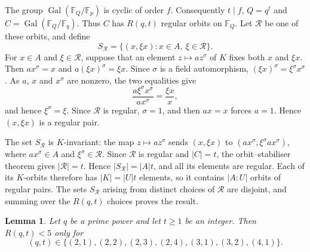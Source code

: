 \documentclass[10pt]{amsart}
\newtheorem{lemma}[theorem]{Lemma}
\theoremstyle{definition}
\renewcommand{\ge}{\geqslant}
\let\oldendproof\endproof
\renewenvironment{proof}[1][\proofname]{%
  \oldproof[\bfseries #1]%
}{\oldendproof}
\DeclareMathOperator{\Gal}{Gal}
\numberwithin{equation}{section}
\numberwithin{table}{section}
\begin{document}
\begin{proof}
The group $\Gal(\mathbb{F}_Q/\mathbb{F}_p)$ is cyclic of order $f$.
Consequently $t\mid f$, $Q=q^t$ and
$C=\Gal(\mathbb{F}_Q/\mathbb{F}_q)$. Thus $C$ has $R(q,t)$ regular orbits
on $\mathbb{F}_Q$. Let $\mathcal R$ be one of these orbits, and define
$$
  S_{\mathcal R}=\{(x,\xi x):x\in A,\ \xi\in\mathcal R\}.
$$
For $x\in A$ and $\xi\in\mathcal R$, suppose that an element
$z\mapsto az^\sigma$ of $K$ fixes both $x$ and $\xi x$. Then
$ax^\sigma=x$ and $a(\xi x)^\sigma=\xi x$. Since $\sigma$ is a field
automorphism, $(\xi x)^\sigma=\xi^\sigma x^\sigma$. As $a$, $x$ and
$x^\sigma$ are nonzero, the two equalities give
$$
  \frac{a\xi^\sigma x^\sigma}{ax^\sigma}=\frac{\xi x}{x},
$$
and hence $\xi^\sigma=\xi$. Since $\mathcal R$ is regular,
$\sigma=1$, and then $ax=x$ forces $a=1$. Hence $(x,\xi x)$ is a regular pair.

The set $S_{\mathcal R}$ is $K$-invariant: the map $z\mapsto az^\sigma$
sends $(x,\xi x)$ to
$(ax^\sigma,\xi^\sigma ax^\sigma)$, where $ax^\sigma\in A$ and
$\xi^\sigma\in\mathcal R$. Since
$\mathcal R$ is regular and $|C|=t$, the orbit--stabiliser theorem gives
$|\mathcal R|=t$. Hence $|S_{\mathcal R}|=|A|t$, and all its elements are
regular. Each of its $K$-orbits
therefore has $|K|=|U|t$ elements, so it contains $|A:U|$ orbits of regular
pairs. The sets $S_{\mathcal R}$ arising from distinct choices of
$\mathcal R$ are disjoint,
and summing over the $R(q,t)$ choices proves the result.
\end{proof}

\begin{lemma}\label{lem:R-small}
Let $q$ be a prime power and let $t\ge1$ be an integer. Then $R(q,t)<5$ only
for
$$
  (q,t)\in\{(2,1),(2,2),(2,3),(2,4),(3,1),(3,2),(4,1)\}.
$$
\end{lemma}
\end{document}
